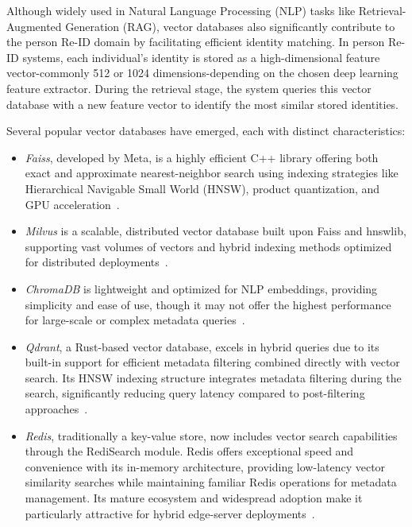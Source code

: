\documentclass[../main.tex]{subfiles}
\begin{document}
Although widely used in Natural Language Processing (NLP) tasks like Retrieval-Augmented Generation (RAG), vector databases also significantly contribute to the person Re-ID domain by facilitating efficient identity matching. In person Re-ID systems, each individual's identity is stored as a high-dimensional feature vector-commonly 512 or 1024 dimensions-depending on the chosen deep learning feature extractor. During the retrieval stage, the system queries this vector database with a new feature vector to identify the most similar stored identities.

Several popular vector databases have emerged, each with distinct characteristics:

\begin{itemize}
  \item \textit{Faiss}, developed by Meta, is a highly efficient C++ library offering both exact and approximate nearest-neighbor search using indexing strategies like Hierarchical Navigable Small World (HNSW), product quantization, and GPU acceleration~\cite{faiss}.
  
  \item \textit{Milvus} is a scalable, distributed vector database built upon Faiss and hnswlib, supporting vast volumes of vectors and hybrid indexing methods optimized for distributed deployments~\cite{milvus}.
  
  \item \textit{ChromaDB} is lightweight and optimized for NLP embeddings, providing simplicity and ease of use, though it may not offer the highest performance for large-scale or complex metadata queries~\cite{chromadb}.
  
  \item \textit{Qdrant}, a Rust-based vector database, excels in hybrid queries due to its built-in support for efficient metadata filtering combined directly with vector search. Its HNSW indexing structure integrates metadata filtering during the search, significantly reducing query latency compared to post-filtering approaches~\cite{qdrant}.
  
  \item \textit{Redis}, traditionally a key-value store, now includes vector search capabilities through the RediSearch module. Redis offers exceptional speed and convenience with its in-memory architecture, providing low-latency vector similarity searches while maintaining familiar Redis operations for metadata management. Its mature ecosystem and widespread adoption make it particularly attractive for hybrid edge-server deployments~\cite{redis_vector}.
  
  
\end{itemize}
\end{document}
